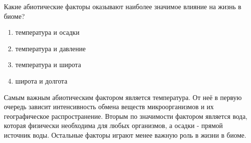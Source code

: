 
Какие абиотические факторы оказывают наиболее значимое влияние на жизнь в биоме?

\begin{enumerate}
    \item температура и осадки
    \item температура и давление
    \item температура и широта
    \item широта и долгота
\end{enumerate}

\explanationSection

Самым важным абиотическим фактором является температура. От неё в первую очередь зависит интенсивность обмена веществ микроорганизмов и их географическое распространение. Вторым по значимости фактором является вода, которая физически необходима для любых организмов, а осадки - прямой источник воды. Остальные факторы играют менее важную роль в жизни в биоме.

